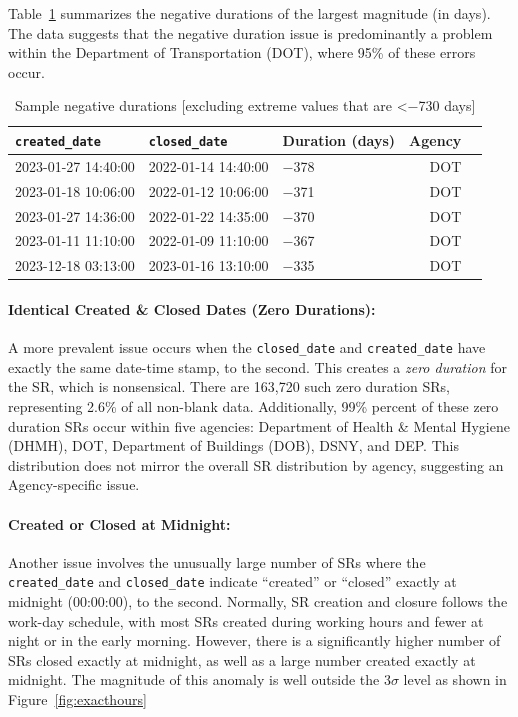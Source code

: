 \documentclass[linenumber]{jdsart}
\begin{document}
Table~\ref{tab:largest-errors} summarizes the 
negative durations of the largest magnitude (in days). The data 
suggests that the negative duration issue is predominantly a problem 
within the Department of Transportation (DOT), where 95\% of these 
errors occur.

\begin{table}[tbp]
  \centering
  \caption{Sample  negative durations [excluding extreme values that are <$-$730 days]}
   \label{tab:largest-errors}
 	\begin{tabular}{l l l r l}
    \toprule
    \texttt{created\_date} & \texttt{closed\_date} & {Duration (days)}  & {Agency} \\
    \midrule
    2023-01-27 14:40:00 & 2022-01-14 14:40:00 & $-$378 & DOT \\
    2023-01-18 10:06:00 & 2022-01-12 10:06:00 & $-$371 & DOT \\
    2023-01-27 14:36:00 & 2022-01-22 14:35:00 & $-$370 & DOT \\
    2023-01-11 11:10:00 & 2022-01-09 11:10:00 & $-$367 & DOT \\
    2023-12-18 03:13:00 & 2023-01-16 13:10:00 & $-$335 & DOT \\
    \bottomrule
    \end{tabular}
 \end{table}

\paragraph{Identical Created \& Closed Dates (Zero Durations):}
A more prevalent issue occurs when the \texttt{closed\_date} and 
\texttt{created\_date} have exactly the same date-time stamp, 
to the second. This creates a \emph{zero duration} for the 
SR, which is nonsensical. There are 163,720 such zero duration 
SRs, representing 2.6\% of all non-blank data. 
Additionally, 99\% percent of these zero duration SRs 
occur within five agencies: Department of Health \& Mental 
Hygiene (DHMH), DOT, Department of Buildings (DOB), DSNY, and 
DEP. This distribution does not mirror the overall SR 
distribution by agency, suggesting an Agency-specific issue.
	
\paragraph{Created or Closed at Midnight:}
Another issue involves the unusually large number of 
SRs where the \texttt{created\_date} and \texttt{closed\_date} 
indicate ``created'' or ``closed'' exactly at midnight (00:00:00), 
to the second. Normally, SR creation and closure follows 
the work-day schedule, with most SRs created 
during working hours and fewer at night or in the 
early morning. However, there is a significantly higher 
number of SRs closed exactly at midnight, as well 
as a large number created exactly at midnight. The magnitude 
of this anomaly is well outside the 3$\sigma$ level as shown 
in Figure~\ref{fig:exacthours}
\end{document}
